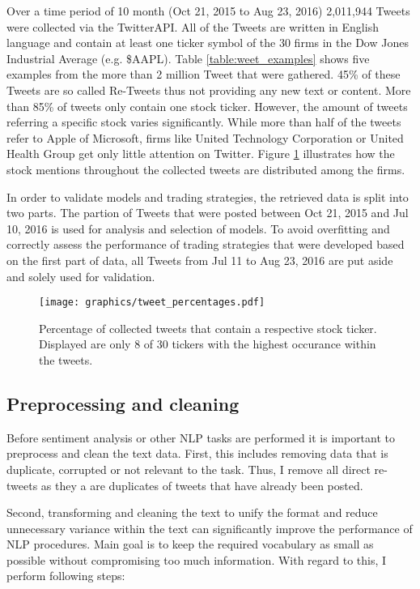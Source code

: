 \documentclass[a4paper,12pt]{article}%
\begin{document}
Over a time period of 10 month (Oct 21, 2015 to Aug 23, 2016) 2,011,944 Tweets were collected via the TwitterAPI. All of the Tweets are written in English language and contain at least one ticker symbol of the 30 firms in the Dow Jones Industrial Average (e.g. \$AAPL). Table \ref{table:weet_examples} shows five examples from the more than 2 million Tweet that were gathered. 45\% of these Tweets are so called Re-Tweets thus not providing any new text or content. More than 85\% of tweets only contain one stock ticker. However, the amount of tweets referring a specific stock varies significantly. While  more than half of the tweets refer to Apple of Microsoft, firms like United Technology Corporation or United Health Group get only little attention on Twitter. Figure \ref{fig:tweet_percentages} illustrates how the stock mentions throughout the collected tweets are distributed among the firms.

In order to validate models and trading strategies, the retrieved data is split into two parts. The partion of Tweets that were posted between Oct 21, 2015 and Jul 10, 2016 is used for analysis and selection of models. To avoid overfitting and correctly assess the performance of trading strategies that were developed based on the first part of data, all Tweets from Jul 11 to Aug 23, 2016 are put aside and solely used for validation.

\begin{figure}
\captionsetup{justification=centering}
\centering
\texttt{[image: graphics/tweet\_percentages.pdf]}
\caption{Percentage of collected tweets that contain a respective stock ticker. Displayed are only 8 of 30 tickers with the highest occurance within the tweets. \label{fig:tweet_percentages}}
\end{figure}

\subsection{Preprocessing and cleaning}
Before sentiment analysis or other NLP tasks are performed it is important to preprocess and clean the text data. First, this includes removing data that is duplicate, corrupted or not relevant to the task. Thus, I remove all direct re-tweets as they a are duplicates of tweets that have already been posted.

Second, transforming and cleaning the text to unify the format and reduce unnecessary variance within the text can significantly improve the performance of NLP procedures. Main goal is to keep the required vocabulary as small as possible without compromising too much information. With regard to this, I perform following steps:
\end{document}
